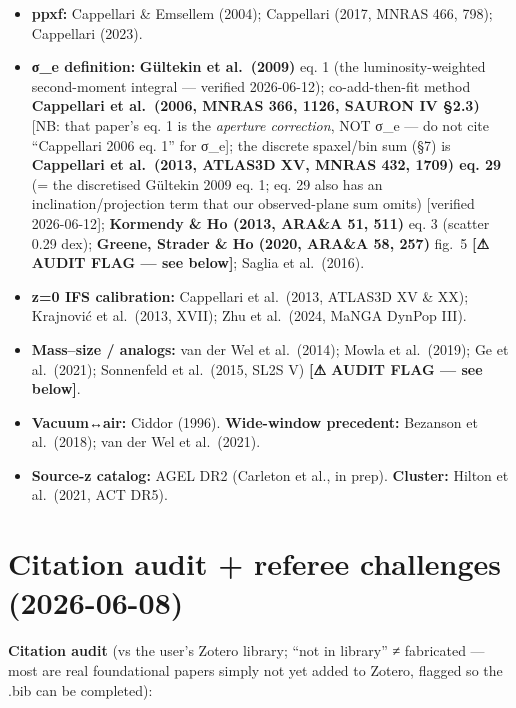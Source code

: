 \documentclass[
]{article}
\providecommand{\tightlist}{%
  \setlength{\itemsep}{0pt}\setlength{\parskip}{0pt}}
\begin{document}
\begin{itemize}
\tightlist
\item
  \textbf{ppxf:} Cappellari \& Emsellem (2004); Cappellari (2017, MNRAS
  466, 798); Cappellari (2023).
\item
  \textbf{σ\_e definition:} \textbf{Gültekin et al.~(2009)} eq. 1 (the
  luminosity-weighted second-moment integral --- verified 2026-06-12);
  co-add-then-fit method \textbf{Cappellari et al.~(2006, MNRAS 366,
  1126, SAURON IV §2.3)} {[}NB: that paper's eq. 1 is the \emph{aperture
  correction}, NOT σ\_e --- do not cite ``Cappellari 2006 eq. 1'' for
  σ\_e{]}; the discrete spaxel/bin sum (§7) is \textbf{Cappellari et
  al.~(2013, ATLAS3D XV, MNRAS 432, 1709) eq. 29} (= the discretised
  Gültekin 2009 eq. 1; eq. 29 also has an inclination/projection term
  that our observed-plane sum omits) {[}verified 2026-06-12{]};
  \textbf{Kormendy \& Ho (2013, ARA\&A 51, 511)} eq. 3 (scatter 0.29
  dex); \textbf{Greene, Strader \& Ho (2020, ARA\&A 58, 257)} fig.~5
  \textbf{{[}⚠ AUDIT FLAG --- see below{]}}; Saglia et al.~(2016).
\item
  \textbf{z=0 IFS calibration:} Cappellari et al.~(2013, ATLAS3D XV \&
  XX); Krajnović et al.~(2013, XVII); Zhu et al.~(2024, MaNGA DynPop
  III).
\item
  \textbf{Mass--size / analogs:} van der Wel et al.~(2014); Mowla et
  al.~(2019); Ge et al.~(2021); Sonnenfeld et al.~(2015, SL2S V)
  \textbf{{[}⚠ AUDIT FLAG --- see below{]}}.
\item
  \textbf{Vacuum↔air:} Ciddor (1996). \textbf{Wide-window precedent:}
  Bezanson et al.~(2018); van der Wel et al.~(2021).
\item
  \textbf{Source-z catalog:} AGEL DR2 (Carleton et al., in prep).
  \textbf{Cluster:} Hilton et al.~(2021, ACT DR5).
\end{itemize}

\hypertarget{citation-audit-referee-challenges-2026-06-08}{%
\section{Citation audit + referee challenges
(2026-06-08)}\label{citation-audit-referee-challenges-2026-06-08}}

\textbf{Citation audit} (vs the user's Zotero library; ``not in
library'' ≠ fabricated --- most are real foundational papers simply not
yet added to Zotero, flagged so the .bib can be completed):
\end{document}
